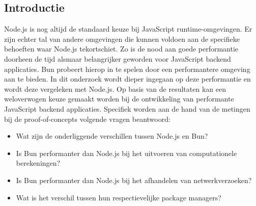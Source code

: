 \documentclass[a0,portrait]{hogent-poster}
\begin{document}
\begin{multicols}{2} %

\section{Introductie}
Node.js is nog altijd de standaard keuze bij JavaScript runtime-omgevingen. 
Er zijn echter tal van andere omgevingen die kunnen voldoen aan de specifieke behoeften waar Node.js tekortschiet.
Zo is de nood aan goede performantie doorheen de tijd alsmaar belangrijker geworden voor JavaScript backend applicaties.
Bun probeert hierop in te spelen door een performantere omgeving aan te bieden. 
In dit onderzoek wordt dieper ingegaan op deze performantie en wordt deze vergeleken met Node.js.
Op basis van de resultaten kan een weloverwogen keuze gemaakt worden bij de ontwikkeling van performante JavaScript backend applicaties.
Specifiek worden aan de hand van de metingen bij de proof-of-concepts volgende vragen beantwoord:
\begin{itemize}
  \item Wat zijn de onderliggende verschillen tussen Node.js en Bun?
  \item Is Bun performanter dan Node.js bij het uitvoeren van computationele berekeningen?
  \item Is Bun performanter dan Node.js bij het afhandelen van netwerkverzoeken?
  \item Wat is het verschil tussen hun respectievelijke package managers?
\end{itemize}

\end{multicols}
\end{document}
